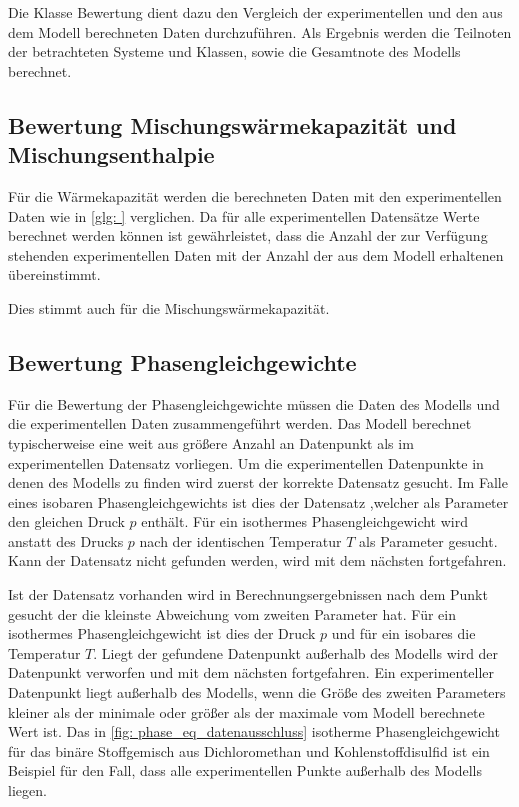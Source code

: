 \documentclass[../thesis.tex]{subfiles}
\begin{document}
Die Klasse Bewertung dient dazu den Vergleich der experimentellen und den aus dem Modell berechneten Daten durchzuführen. Als Ergebnis werden die Teilnoten der betrachteten Systeme und Klassen, sowie die Gesamtnote des Modells berechnet.

\subsection{Bewertung Mischungswärmekapazität und Mischungsenthalpie}

Für die Wärmekapazität werden die berechneten Daten mit den experimentellen Daten wie in \autoref{glg: } verglichen. Da für alle experimentellen Datensätze Werte berechnet werden können ist gewährleistet, dass die Anzahl der zur Verfügung stehenden experimentellen Daten mit der Anzahl der aus dem Modell erhaltenen übereinstimmt.

Dies stimmt auch für die Mischungswärmekapazität.

\subsection{Bewertung Phasengleichgewichte}

Für die Bewertung der Phasengleichgewichte müssen die Daten des Modells und die experimentellen Daten zusammengeführt werden. Das Modell berechnet typischerweise eine weit aus größere Anzahl an Datenpunkt als im experimentellen Datensatz vorliegen.  Um die experimentellen Datenpunkte in denen des Modells zu finden wird zuerst der korrekte Datensatz gesucht. Im Falle eines isobaren Phasengleichgewichts ist dies der Datensatz ,welcher als Parameter den gleichen Druck $p$ enthält. Für ein isothermes Phasengleichgewicht wird anstatt des Drucks $p$ nach der identischen Temperatur $T$ als Parameter gesucht. Kann der Datensatz nicht gefunden werden, wird mit dem nächsten fortgefahren.

Ist der Datensatz vorhanden wird in Berechnungsergebnissen nach dem Punkt gesucht der die kleinste Abweichung vom zweiten Parameter hat. Für ein isothermes Phasengleichgewicht ist dies der Druck $p$ und für ein isobares die Temperatur $T$. Liegt der gefundene Datenpunkt außerhalb des Modells wird der Datenpunkt verworfen und mit dem nächsten fortgefahren. Ein experimenteller Datenpunkt liegt außerhalb des Modells, wenn die Größe des zweiten Parameters kleiner als der minimale oder größer als der maximale vom Modell berechnete Wert ist. Das in \autoref{fig: phase_eq_datenausschluss} isotherme Phasengleichgewicht für das binäre Stoffgemisch aus Dichloromethan und Kohlenstoffdisulfid ist ein Beispiel für den Fall, dass alle experimentellen Punkte außerhalb des Modells liegen. 
\end{document}
